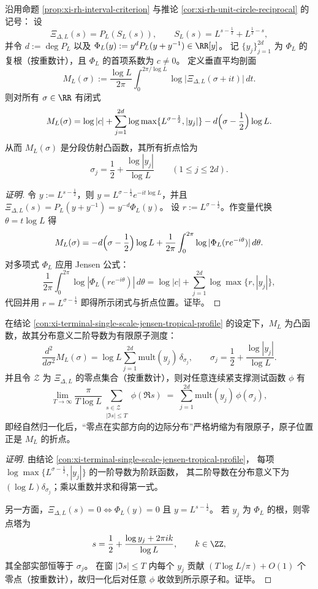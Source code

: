 \begin{conclusion}\label{con:xi-terminal-single-scale-jensen-tropical-profile}
沿用命题 \ref{prop:xi-rh-interval-criterion} 与推论 \ref{cor:xi-rh-unit-circle-reciprocal} 的记号：
设
\[
\Xi_{\Delta,L}(s)=P_L(S_L(s)),\qquad S_L(s)=L^{s-\frac12}+L^{\frac12-s},
\]
并令 \(d:=\deg P_L\) 以及
\(
\Phi_L(y):=y^{d}P_L(y+y^{-1})\in\RR[y]
\)。
记 \(\{y_j\}_{j=1}^{2d}\) 为 \(\Phi_L\) 的复根（按重数计），且 \(\Phi_L\) 的首项系数为 \(c\neq 0\)。
定义垂直平均剖面
\[
M_L(\sigma):=\frac{\log L}{2\pi}\int_{0}^{2\pi/\log L}\log\bigl|\Xi_{\Delta,L}(\sigma+it)\bigr|\,dt.
\]
则对所有 \(\sigma\in\RR\) 有闭式
\[
M_L(\sigma)=\log|c|+\sum_{j=1}^{2d}\log\max\{L^{\sigma-\frac12},|y_j|\}-d\Bigl(\sigma-\frac12\Bigr)\log L.
\]
从而 \(M_L(\sigma)\) 是分段仿射凸函数，其所有折点恰为
\[
\sigma_j=\frac12+\frac{\log|y_j|}{\log L}\qquad(1\le j\le 2d).
\]
\end{conclusion}
\begin{proof}[证明]
令 \(y:=L^{s-\frac12}\)，则 \(y=L^{\sigma-\frac12}e^{-it\log L}\)，并且
\(
\Xi_{\Delta,L}(s)=P_L(y+y^{-1})=y^{-d}\Phi_L(y)
\)。
设 \(r:=L^{\sigma-\frac12}\)。作变量代换 \(\theta=t\log L\) 得
\[
M_L(\sigma)
=-d\Bigl(\sigma-\frac12\Bigr)\log L+\frac{1}{2\pi}\int_{0}^{2\pi}\log|\Phi_L(re^{-i\theta})|\,d\theta.
\]
对多项式 \(\Phi_L\) 应用 Jensen 公式：
\[
\frac{1}{2\pi}\int_{0}^{2\pi}\log|\Phi_L(re^{-i\theta})|\,d\theta
=\log|c|+\sum_{j=1}^{2d}\log\max\{r,|y_j|\},
\]
代回并用 \(r=L^{\sigma-\frac12}\) 即得所示闭式与折点位置。证毕。
\end{proof}

\begin{conclusion}\label{con:xi-terminal-single-scale-offline-spectral-measure-atomicity}
在结论 \ref{con:xi-terminal-single-scale-jensen-tropical-profile} 的设定下，\(M_L\) 为凸函数，故其分布意义二阶导数为有限原子测度：
\[
\frac{d^{2}}{d\sigma^{2}}M_L(\sigma)=\log L\sum_{j=1}^{2d}\mathrm{mult}(y_j)\,\delta_{\sigma_j},
\qquad
\sigma_j=\frac12+\frac{\log|y_j|}{\log L}.
\]
并且令 \(\mathcal Z\) 为 \(\Xi_{\Delta,L}\) 的零点集合（按重数计），则对任意连续紧支撑测试函数 \(\phi\) 有
\[
\lim_{T\to\infty}\frac{\pi}{T\log L}\sum_{\substack{s\in\mathcal Z\\ |\Im s|\le T}}\phi(\Re s)
\;=\;
\sum_{j=1}^{2d}\mathrm{mult}(y_j)\,\phi(\sigma_j),
\]
即经自然归一化后，“零点在实部方向的边际分布”严格坍缩为有限原子，原子位置正是 \(M_L\) 的折点。
\end{conclusion}
\begin{proof}[证明]
由结论 \ref{con:xi-terminal-single-scale-jensen-tropical-profile}，
每项 \(\log\max\{L^{\sigma-\frac12},|y_j|\}\) 的一阶导数为阶跃函数，
其二阶导数在分布意义下为 \((\log L)\delta_{\sigma_j}\)；乘以重数并求和得第一式。
\par
另一方面，\(\Xi_{\Delta,L}(s)=0\iff \Phi_L(y)=0\) 且 \(y=L^{s-\frac12}\)。
若 \(y_j\) 为 \(\Phi_L\) 的根，则零点塔为
\[
s=\frac12+\frac{\log y_j+2\pi i k}{\log L},\qquad k\in\ZZ,
\]
其全部实部恒等于 \(\sigma_j\)。
在窗 \(|\Im s|\le T\) 内每个 \(y_j\) 贡献 \( (T\log L/\pi)+O(1)\) 个零点（按重数计），故归一化后对任意 \(\phi\) 收敛到所示原子和。证毕。
\end{proof}

